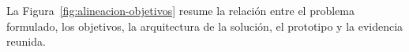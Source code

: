 \documentclass[conference]{IEEEtran}
\begin{document}
La Figura~\ref{fig:alineacion-objetivos} resume la relación entre el problema
formulado, los objetivos, la arquitectura de la solución, el prototipo y la
evidencia reunida.
\end{document}
